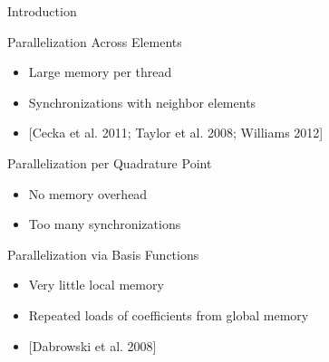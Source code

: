 \begin{frame}{Introduction}

 \begin{block}{Parallelization Across Elements}
  \begin{itemize}
   \item Large memory per thread
   \item Synchronizations with neighbor elements
   \item {\small [Cecka et al. 2011; Taylor et al. 2008; Williams 2012]}
  \end{itemize}
 \end{block}

 \begin{minipage}{0.5\textwidth}
 \begin{block}{Parallelization per Quadrature Point}
  \begin{itemize}
   \item No memory overhead
   \item Too many synchronizations
  \end{itemize}
 \end{block}
 \end{minipage}


 \begin{block}{Parallelization via Basis Functions}
  \begin{itemize}
   \item Very little local memory
   \item Repeated loads of coefficients from global memory
   \item {\small [Dabrowski et al. 2008]}
  \end{itemize}
 \end{block}

\end{frame}

